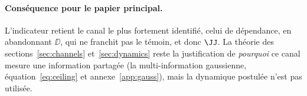 \paragraph{Conséquence pour le papier principal.} L'indicateur retient le canal
le plus fortement identifié, celui de dépendance, en abandonnant $\DD$, qui ne
franchit pas le témoin, et donc $\JJ$. La théorie des
sections~\ref{sec:channels} et~\ref{sec:dynamics} reste la justification de
\emph{pourquoi} ce canal mesure une information partagée (la
multi-information gaussienne, équation~\eqref{eq:ceiling} et annexe~\ref{app:gauss}),
mais la dynamique postulée n'est pas utilisée.
